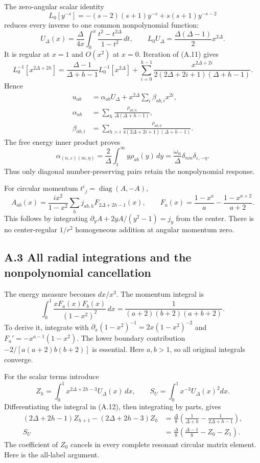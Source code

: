 The zero-angular scalar identity \[
L_0[y^{-s}]=-(s-2)(s+1)y^{-s}+s(s+1)y^{-s-2}
\tag{A.11}
\] reduces every inverse to one common nonpolynomial function: \[
U_\Delta(x)=\frac{\Delta}{4x}
\int_0^x\frac{t^2-t^{2\Delta}}{1-t^2}\,dt,\qquad
L_0U_\Delta=\frac{\Delta(\Delta-1)}2x^{2\Delta}.
\tag{A.12}
\] It is regular at \(x=1\) and \(O(x^2)\) at \(x=0\). Iteration of (A.11) gives \[
L_0^{-1}[x^{2\Delta+2h}]
=\frac{\Delta-1}{\Delta+h-1}L_0^{-1}[x^{2\Delta}]
+\sum_{i=0}^{h-1}
\frac{x^{2\Delta+2i}}{2(2\Delta+2i+1)(\Delta+h-1)} .
\tag{A.13}
\] Hence \[
\begin{aligned}
u_{ab}&=\alpha_{ab}U_\Delta
+x^{2\Delta}\sum_i\beta_{ab,i}x^{2i},\\
\alpha_{ab}&=\sum_h\frac{\rho_{ab,h}}{\Delta(\Delta+h-1)},\\
\beta_{ab,i}&=\sum_{h>i}
\frac{\rho_{ab,h}}{4(2\Delta+2i+1)(\Delta+h-1)}.
\end{aligned}
\tag{A.14}
\] The free energy inner product proves \[
\alpha_{(n,\varepsilon)(m,\eta)}
=\frac2\Delta\int_1^\infty y\rho_{ab}(y)\,dy
=\frac{\omega_n}{\Delta}\delta_{nm}\delta_{\varepsilon,-\eta}.
\tag{A.15}
\] Thus only diagonal number-preserving pairs retain the nonpolynomial response.

For circular momentum \(t^i{}_j=\operatorname{diag}(A,-A)\), \[
A_{ab}(x)=\frac{ix^2}{1-x^2}
\sum_hj_{ab,h}F_{2\Delta+2h-1}(x),\qquad
F_a(x)=\frac{1-x^a}{a}-\frac{1-x^{a+2}}{a+2}.
\tag{A.16}
\] This follows by integrating \(\partial_yA+2yA/(y^2-1)=j_y\) from the center. There is no center-regular \(1/r^2\) homogeneous addition at angular momentum zero.

\hypertarget{a.3-all-radial-integrations-and-the-nonpolynomial-cancellation}{%
\subsection{A.3 All radial integrations and the nonpolynomial cancellation}\label{a.3-all-radial-integrations-and-the-nonpolynomial-cancellation}}

The energy measure becomes \(dx/x^3\). The momentum integral is \[
\int_0^1\frac{xF_a(x)F_b(x)}{(1-x^2)^2}\,dx
=\frac1{(a+2)(b+2)(a+b+2)}.
\tag{A.17}
\] To derive it, integrate with \(\partial_x(1-x^2)^{-1}=2x(1-x^2)^{-2}\) and \(F_a'=-x^{a-1}(1-x^2)\). The lower boundary contribution \(-2/[a(a+2)b(b+2)]\) is essential. Here \(a,b>1\), so all original integrals converge.

For the scalar terms introduce \[
Z_h=\int_0^1x^{2\Delta+2h-3}U_\Delta(x)\,dx,\qquad
S_U=\int_0^1x^{-3}U_\Delta(x)^2dx .
\] Differentiating the integral in (A.12), then integrating by parts, gives \[
\begin{aligned}
(2\Delta+2h-1)Z_{h+1}-(2\Delta+2h-3)Z_h
&=\frac{\Delta}{8}
\left(\frac1{\Delta+h}-\frac1{2\Delta+h-1}\right),\\
S_U&=\frac{\Delta}{8}
\left(\frac{\Delta-1}{8}-Z_0-Z_1\right).
\end{aligned}
\tag{A.18}
\] The coefficient of \(Z_0\) cancels in every complete resonant circular matrix element. Here is the all-label argument.

